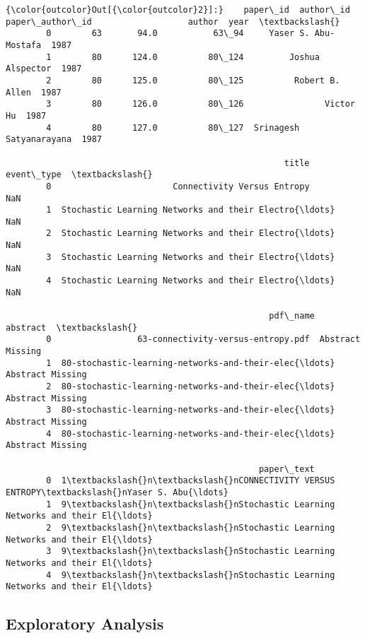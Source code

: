 \documentclass[11pt]{article}
\begin{document}
\begin{Verbatim}[commandchars=\\\{\}]
{\color{outcolor}Out[{\color{outcolor}2}]:}    paper\_id  author\_id paper\_author\_id                   author  year  \textbackslash{}
        0        63       94.0           63\_94     Yaser S. Abu-Mostafa  1987   
        1        80      124.0          80\_124         Joshua Alspector  1987   
        2        80      125.0          80\_125          Robert B. Allen  1987   
        3        80      126.0          80\_126                Victor Hu  1987   
        4        80      127.0          80\_127  Srinagesh Satyanarayana  1987   
        
                                                       title event\_type  \textbackslash{}
        0                        Connectivity Versus Entropy        NaN   
        1  Stochastic Learning Networks and their Electro{\ldots}        NaN   
        2  Stochastic Learning Networks and their Electro{\ldots}        NaN   
        3  Stochastic Learning Networks and their Electro{\ldots}        NaN   
        4  Stochastic Learning Networks and their Electro{\ldots}        NaN   
        
                                                    pdf\_name          abstract  \textbackslash{}
        0                 63-connectivity-versus-entropy.pdf  Abstract Missing   
        1  80-stochastic-learning-networks-and-their-elec{\ldots}  Abstract Missing   
        2  80-stochastic-learning-networks-and-their-elec{\ldots}  Abstract Missing   
        3  80-stochastic-learning-networks-and-their-elec{\ldots}  Abstract Missing   
        4  80-stochastic-learning-networks-and-their-elec{\ldots}  Abstract Missing   
        
                                                  paper\_text  
        0  1\textbackslash{}n\textbackslash{}nCONNECTIVITY VERSUS ENTROPY\textbackslash{}nYaser S. Abu{\ldots}  
        1  9\textbackslash{}n\textbackslash{}nStochastic Learning Networks and their El{\ldots}  
        2  9\textbackslash{}n\textbackslash{}nStochastic Learning Networks and their El{\ldots}  
        3  9\textbackslash{}n\textbackslash{}nStochastic Learning Networks and their El{\ldots}  
        4  9\textbackslash{}n\textbackslash{}nStochastic Learning Networks and their El{\ldots}  
\end{Verbatim}
            
    \subsection{Exploratory Analysis}\label{exploratory-analysis}
\end{document}
